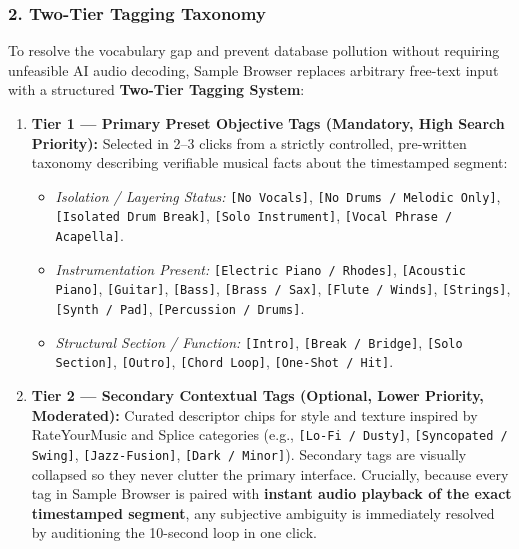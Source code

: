 \subsubsection*{2. Two-Tier Tagging Taxonomy}
To resolve the vocabulary gap and prevent database pollution without requiring unfeasible AI audio decoding, Sample Browser replaces arbitrary free-text input with a structured \textbf{Two-Tier Tagging System}:
\begin{enumerate}
    \item \textbf{Tier 1 --- Primary Preset Objective Tags (Mandatory, High Search Priority):} Selected in 2--3 clicks from a strictly controlled, pre-written taxonomy describing verifiable musical facts about the timestamped segment:
    \begin{itemize}[nosep]
        \item \textit{Isolation / Layering Status:} \texttt{[No Vocals]}, \texttt{[No Drums / Melodic Only]}, \texttt{[Isolated Drum Break]}, \texttt{[Solo Instrument]}, \texttt{[Vocal Phrase / Acapella]}.
        \item \textit{Instrumentation Present:} \texttt{[Electric Piano / Rhodes]}, \texttt{[Acoustic Piano]}, \texttt{[Guitar]}, \texttt{[Bass]}, \texttt{[Brass / Sax]}, \texttt{[Flute / Winds]}, \texttt{[Strings]}, \texttt{[Synth / Pad]}, \texttt{[Percussion / Drums]}.
        \item \textit{Structural Section / Function:} \texttt{[Intro]}, \texttt{[Break / Bridge]}, \texttt{[Solo Section]}, \texttt{[Outro]}, \texttt{[Chord Loop]}, \texttt{[One-Shot / Hit]}.
    \end{itemize}
    \item \textbf{Tier 2 --- Secondary Contextual Tags (Optional, Lower Priority, Moderated):} Curated descriptor chips for style and texture inspired by RateYourMusic and Splice categories (e.g., \texttt{[Lo-Fi / Dusty]}, \texttt{[Syncopated / Swing]}, \texttt{[Jazz-Fusion]}, \texttt{[Dark / Minor]}). Secondary tags are visually collapsed so they never clutter the primary interface. Crucially, because every tag in Sample Browser is paired with \textbf{instant audio playback of the exact timestamped segment}, any subjective ambiguity is immediately resolved by auditioning the 10-second loop in one click.
\end{enumerate}

